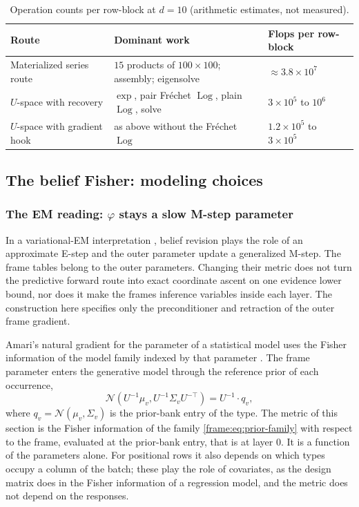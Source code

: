 \documentclass[11pt]{article}
\theoremstyle{definition}
\theoremstyle{remark}
\providecommand{\Log}{\operatorname{Log}}
\providecommand{\Normal}{\mathcal{N}}
\begin{document}
\begin{table}[h]
\centering
\small
\begin{tabular}{lll}
\toprule
Route & Dominant work & Flops per row-block\\
\midrule
Materialized series route & $15$ products of $100\times100$; assembly; eigensolve & $\approx3.8\times10^7$\\
$U$-space with recovery & $\exp$, pair Fr\'echet $\Log$, plain $\Log$, solve & $3\times10^5$ to $10^6$\\
$U$-space with gradient hook & as above without the Fr\'echet $\Log$ & $1.2\times10^5$ to $3\times10^5$\\
\bottomrule
\end{tabular}
\caption{Operation counts per row-block at $d=10$ (arithmetic estimates, not measured).}\label{frame:tab:cost-pullback}
\end{table}

\subsection{The belief Fisher: modeling choices}\label{frame:sec:em}

\subsubsection{The EM reading: \texorpdfstring{$\varphi$}{phi} stays a slow M-step parameter}

In a variational-EM interpretation \cite{inference:dempster1977,frame:NealHinton1998}, belief revision plays the role of an approximate E-step and the outer parameter update a generalized M-step. The frame tables belong to the outer parameters. Changing their metric does not turn the predictive forward route into exact coordinate ascent on one evidence lower bound, nor does it make the frames inference variables inside each layer. The construction here specifies only the preconditioner and retraction of the outer frame gradient.

Amari's natural gradient for the parameter of a statistical model uses the Fisher information of the model family indexed by that parameter \cite{frame:Amari1998,frame:AmariNagaoka2000}. The frame parameter enters the generative model through the reference prior of each occurrence,
\begin{equation}\label{frame:eq:prior-family}
\Normal\left(U^{-1}\mu_v,U^{-1}\Sigma_vU^{-\top}\right)=U^{-1}\cdot q_v,
\end{equation}
where $q_v=\Normal(\mu_v,\Sigma_v)$ is the prior-bank entry of the type. The metric of this section is the Fisher information of the family \eqref{frame:eq:prior-family} with respect to the frame, evaluated at the prior-bank entry, that is at layer $0$. It is a function of the parameters alone. For positional rows it also depends on which types occupy a column of the batch; these play the role of covariates, as the design matrix does in the Fisher information of a regression model, and the metric does not depend on the responses.
\end{document}
